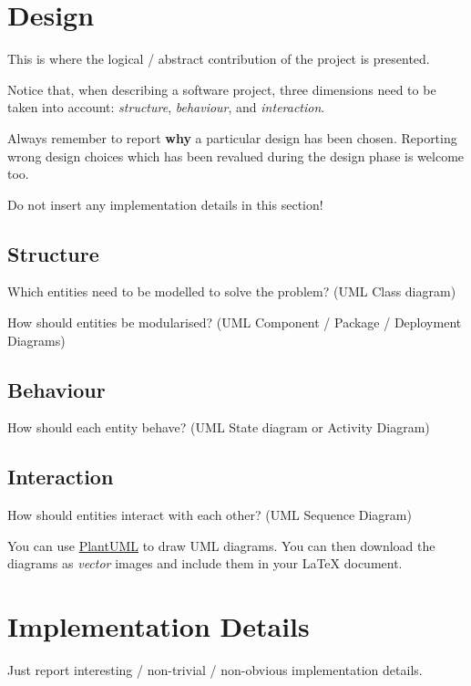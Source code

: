 \documentclass{scrartcl}
\begin{document}
\section{Design}\label{sec:design}

This is where the logical / abstract contribution of the project is presented.

Notice that, when describing a software project, three dimensions need to be taken into account: \emph{structure}, \emph{behaviour}, and \emph{interaction}.

Always remember to report \textbf{why} a particular design has been chosen.
%
Reporting wrong design choices which has been revalued during the design phase is welcome too.

Do not insert any implementation details in this section!
%

\subsection{Structure}\label{subsec:structure}

Which entities need to be modelled to solve the problem?
%
(UML Class diagram)

How should entities be modularised?
%
(UML Component / Package / Deployment Diagrams)

\subsection{Behaviour}\label{subsec:behaviour}

How should each entity behave?
%
(UML State diagram or Activity Diagram)

\subsection{Interaction}\label{subsec:interaction}

How should entities interact with each other?
%
(UML Sequence Diagram)

You can use \href{https://plantuml.com/}{PlantUML} to draw UML diagrams.
%
You can then download the diagrams as \emph{vector} images and include them in your \LaTeX{} document.

\section{Implementation Details}\label{sec:implementation-details}

Just report interesting / non-trivial / non-obvious implementation details.
\end{document}
